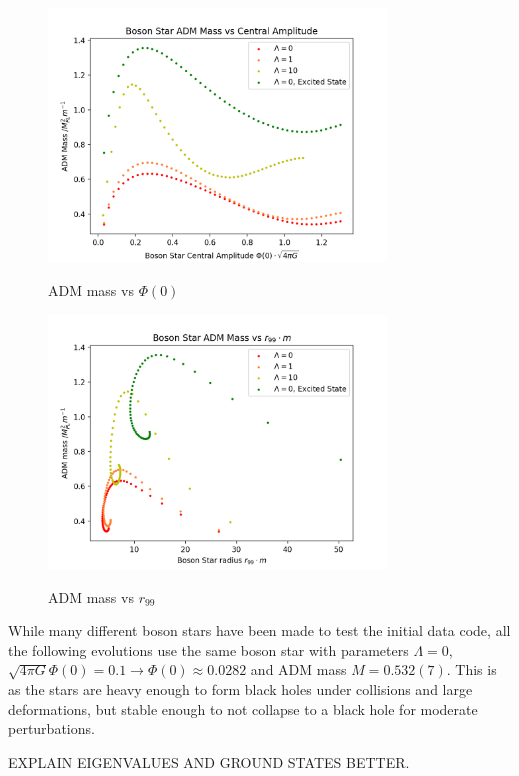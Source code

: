   \begin{figure}[h!]
  \caption{ADM mass vs $\Phi(0)$}
  \centering
  \includegraphics[width=0.8\textwidth]{png/ADM_vs_PC.png}\label{boson:fig:f1}
\end{figure}

  \begin{figure}[h!]
  \caption{ADM mass vs $r_{99}$}
  \centering
  \includegraphics[width=0.8\textwidth]{png/ADM_vs_r99.png}\label{boson:fig:f2}
\end{figure}

While many different boson stars have been made to test the initial data code, all the following evolutions use the same boson star with parameters $\Lambda=0$, $\sqrt{4\pi G}\Phi(0)=0.1 \rightarrow \Phi(0) \approx 0.0282$ and ADM mass $M=0.532(7)$. This is as the stars are heavy enough to form black holes under collisions and large deformations, but stable enough to not collapse to a black hole for moderate perturbations.


EXPLAIN EIGENVALUES AND GROUND STATES BETTER.



